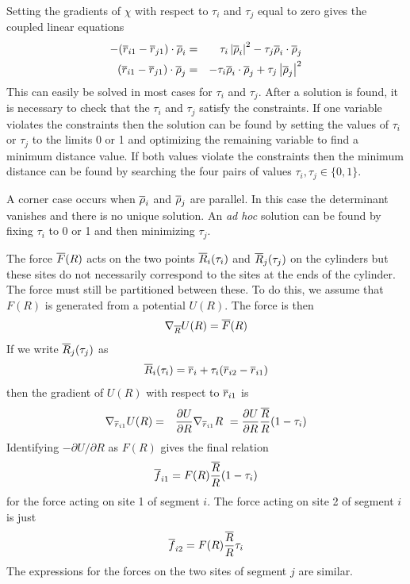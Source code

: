 \documentclass[12pt]{article}
\begin{document}
Setting the gradients of $\chi$ with respect to $\tau_i$ and $\tau_j$ equal to
zero gives the coupled linear equations
\begin{eqnarray*}
-(\overline{r}_{i1}-\overline{r}_{j1})\cdot\overline{\rho}_i & = & \tau_i\left|\overline{\rho}_i\right|^2
                                        - \tau_j\overline{\rho}_i\cdot\overline{\rho}_j \\
(\overline{r}_{i1}-\overline{r}_{j1})\cdot\overline{\rho}_j & = & - \tau_i\overline{\rho}_i\cdot\overline{\rho}_j
                                       + \tau_j\left|\overline{\rho}_j\right|^2
\end{eqnarray*}
This can easily be solved in most cases for $\tau_i$ and $\tau_j$.
After a solution is found, it is necessary to check that the $\tau_i$ and $\tau_j$
satisfy the constraints. If one variable violates the constraints then the solution
can be found by setting the values of $\tau_i$ or $\tau_j$ to the limits 0 or 1 and
optimizing the remaining variable to find a minimum distance value. 
If both values violate the constraints then the minimum distance can be found
by searching the four pairs of values $\tau_i,\tau_j\in\{0,1\}$.

A corner case occurs when $\overline{\rho}_i$ and $\overline{\rho}_j$ are parallel. In this case the
determinant vanishes and there is no unique solution. An {\em ad hoc} solution can be
found by fixing $\tau_i$ to 0 or 1 and then minimizing $\tau_j$.

The force $\overline{F}(R)$ acts on the two points $\overline{R}_i(\tau_i)$ and
$\overline{R}_j(\tau_j)$ on the cylinders but these sites do not necessarily correspond
to the sites at the ends of the cylinder.  The force must still be partitioned
between these. To do
this, we assume that $F(R)$ is generated from a potential $U(R)$. The force is
then
\[
\nabla_{\overline{R}}U(R) = \overline{F}(R)
\]
If we write $\overline{R}_j(\tau_j)$ as
\[
\overline{R}_i(\tau_i) = \overline{r}_i + \tau_i (\overline{r}_{i2}-\overline{r}_{i1})
\]
then the gradient of $U(R)$ with respect to $\overline{r}_{i1}$ is
\begin{eqnarray*}
\nabla_{\overline{r}_{i1}}U(R) & = & \frac{\partial U}{\partial R}\nabla_{\overline{r}_{i1}}R\
 = \frac{\partial U}{\partial R}\frac{\overline{R}}{R} (1-\tau_i)
\end{eqnarray*}
Identifying $-\partial U/\partial R$ as $F(R)$ gives the final relation
\[
\overline{f}_{i1} = F(R)\frac{\overline{R}}{R}(1-\tau_i)
\]
for the force acting on site 1 of segment $i$. The force acting on site 2 of segment
$i$ is just
\[
\overline{f}_{i2} = F(R)\frac{\overline{R}}{R}\tau_i
\]
The expressions for the forces on the two sites of segment $j$ are similar.
\end{document}
